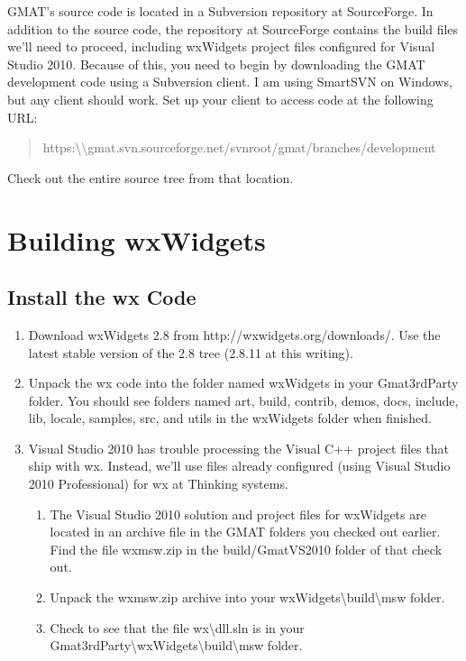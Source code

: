 \documentclass[letterpaper,10pt]{article}%
\begin{document}
GMAT's source code is located in a Subversion repository at SourceForge.  In addition to the source code, the repository at SourceForge contains the build files we'll need to proceed, including wxWidgets project files configured for Visual Studio 2010.  Because of this, you need to begin by downloading the GMAT development code using a Subversion client.  I am using SmartSVN on Windows, but any client should work.  Set up your client to access code at the following URL:

\begin{quote}
https:\textbackslash\textbackslash gmat.svn.sourceforge.net/svnroot/gmat/branches/development
\end{quote}
\noindent Check out the entire source tree from that location.

\section{Building wxWidgets}

\subsection{Install the wx Code}

\begin{enumerate}
\item Download wxWidgets 2.8 from http://wxwidgets.org/downloads/.  Use the latest stable version of the 2.8 tree (2.8.11 at this writing).
\item Unpack the wx code into the folder named wxWidgets in your Gmat3rdParty folder.  You should see folders named art, build, contrib, demos, docs, include, lib, locale, samples, src, and utils in the wxWidgets folder when finished.
\item Visual Studio 2010 has trouble processing the Visual C++ project files that ship with wx.  Instead, we'll use files already configured (using Visual Studio 2010 Professional) for wx at Thinking systems. 
\begin{enumerate}
\item The Visual Studio 2010 solution and project files for wxWidgets are located in an archive file in the GMAT folders you checked out earlier.  Find the file wxmsw.zip in the build/GmatVS2010 folder of that check out.
\item Unpack the wxmsw.zip archive into your wxWidgets\textbackslash build\textbackslash msw folder.
\item Check to see that the file wx\textbackslash dll.sln is in your Gmat3rdParty\textbackslash wxWidgets\textbackslash build\textbackslash msw folder.
\end{enumerate}
 
\end{enumerate}
\end{document}
